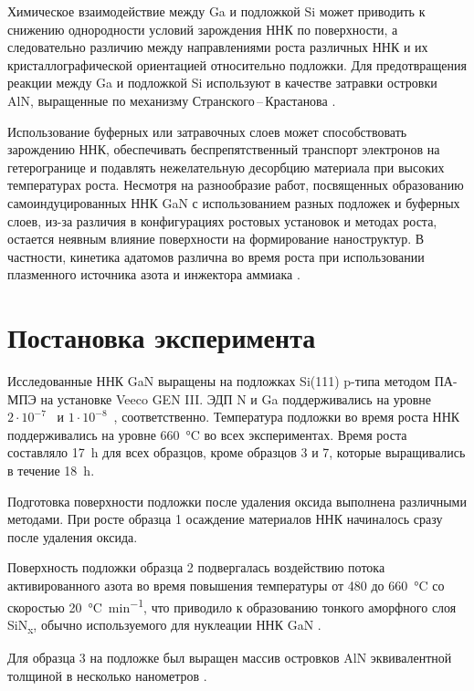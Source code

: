 Химическое взаимодействие между Ga и подложкой Si может приводить к снижению однородности условий зарождения ННК по поверхности, а следовательно различию между направлениями роста различных ННК и их кристаллографической ориентацией относительно подложки. Для предотвращения реакции между Ga и подложкой Si используют в качестве затравки островки AlN, выращенные по механизму Странского\,--\,Крастанова \cite{Songmuang2007}.

Использование буферных или затравочных слоев может способствовать зарождению ННК, обеспечивать беспрепятственный транспорт электронов на гетерогранице и подавлять нежелательную десорбцию материала при высоких температурах роста. Несмотря на разнообразие работ, посвященных образованию самоиндуцированных ННК GaN с использованием разных подложек и буферных слоев, из-за различия в конфигурациях ростовых установок и методах роста, остается неявным влияние поверхности на формирование наноструктур. В частности, кинетика адатомов различна во время роста при использовании плазменного источника азота и инжектора аммиака \cite{Kawaharazuka2010}.

\section{Постановка эксперимента}\label{sec:ch4/sec1}

Исследованные ННК GaN выращены на подложках Si(111) p-типа методом ПА-МПЭ на установке Veeco GEN III. ЭДП N и Ga поддерживались на уровне \(2 \cdot 10^{-7}\)~\si{\torr} и \(1 \cdot 10^{-8}\)~\si{\torr}, соответственно. Температура подложки во время роста ННК поддерживались на уровне 660~\si{\degreeCelsius} во всех экспериментах. Время роста составляло 17~\si{\hour} для всех образцов, кроме образцов 3 и 7, которые выращивались в течение 18~\si{\hour}.

Подготовка поверхности подложки после удаления оксида выполнена различными методами. При росте образца 1 осаждение материалов ННК начиналось сразу после удаления оксида.

Поверхность подложки образца 2 подвергалась воздействию потока активированного азота во время повышения температуры от 480 до 660~\si{\degreeCelsius} со скоростью 20~\si{\degreeCelsius\per\minute}, что приводило к образованию тонкого аморфного слоя SiN\textsubscript{x}, обычно используемого для нуклеации ННК GaN \cite{Wierzbicka2013}.

Для образца 3 на подложке был выращен массив островков AlN эквивалентной толщиной в несколько нанометров \cite{Bolshakov2018}.

